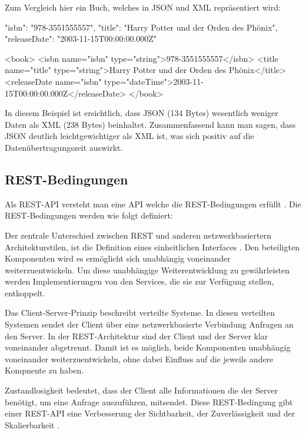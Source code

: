Zum Vergleich hier ein Buch, welches in JSON und XML repräsentiert wird:
\begin{JsCode}
{
    "isbn": "978-3551555557",
    "title": "Harry Potter und der Orden des Phönix",
    "releaseDate": "2003-11-15T00:00:00.000Z"
}
\end{JsCode}

\begin{XmlCode}
<book>
    <isbn name="isbn" type="string">978-3551555557</isbn>
    <title name="title" type="string">Harry Potter und der Orden des Phönix</title>
    <releaseDate name="isbn" type="dateTime">2003-11-15T00:00:00.000Z</releaseDate>
</book>
\end{XmlCode}

In diesem Beispiel ist ersichtlich, dass JSON (134 Bytes) wesentlich weniger Daten als XML (238 Bytes) beinhaltet.
Zusammenfassend kann man sagen, dass JSON deutlich leichtgewichtiger als XML ist, was sich positiv auf die Datenübertragungszeit auswirkt.

\subsection{REST-Bedingungen}
Als REST-API versteht man eine API welche die REST-Bedingungen erfüllt \parencite[Abs. REST-APIs]{graphcms}.
Die REST-Bedingungen werden wie folgt definiert:

Der zentrale Unterschied zwischen REST und anderen netzwerkbasiertern Architekturstilen, ist die Definition eines einheitlichen Interfaces \parencite[S.81]{fielding2000architectural}.
Den beteiligten Komponenten wird es ermöglicht sich unabhängig voneinander weiterzuentwickeln.
Um diese unabhängige Weiterentwicklung zu gewährleisten werden Implementierungen von den Services, die sie zur Verfügung stellen, entkoppelt.

Das Client-Server-Prinzip beschreibt verteilte Systeme.
In diesen verteilten Systemen sendet der Client über eine netzwerkbasierte Verbindung Anfragen an den Server.
In der REST-Architektur sind der Client und der Server klar voneinander abgetrennt.
Damit ist es möglich, beide Komponenten unabhängig voneinander weiterzuentwickeln, ohne dabei Einfluss auf die jeweils andere Kompnente zu haben.

Zustandlosigkeit bedeutet, dass der Client alle Informationen die der Server benötigt, um eine Anfrage auszuführen, mitsendet.
Diese REST-Bedingung gibt einer REST-API eine Verbesserung der Sichtbarkeit, der Zuverlässigkeit und der Skalierbarkeit \parencite[S. 79]{fielding2000architectural}.

